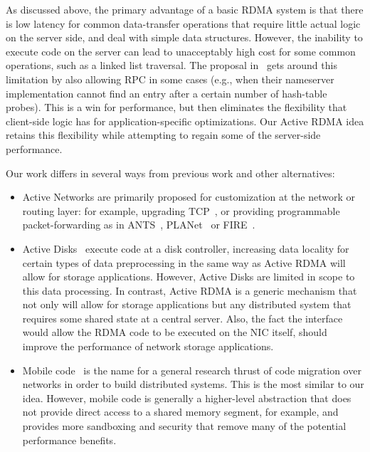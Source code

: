 \documentclass[10pt]{article}
\begin{document}
As discussed above, the primary advantage of a basic RDMA system is
that there is low latency for common data-transfer operations that
require little actual logic on the server side, and deal with simple
data structures. However, the inability to execute code on the server
can lead to unacceptably high cost for some common operations, such as
a linked list traversal. The proposal in~\cite{thekkath94} gets around
this limitation by also allowing RPC in some cases (e.g., when their
nameserver implementation cannot find an entry after a certain number
of hash-table probes). This is a win for performance, but then
eliminates the flexibility that client-side logic has for
application-specific optimizations. Our Active RDMA idea retains this
flexibility while attempting to regain some of the server-side
performance.

Our work differs in several ways from previous work and other
alternatives:

\begin{itemize} \itemsep -2pt

\item Active Networks are primarily proposed for customization at the
  network or routing layer: for example, upgrading TCP~\cite{AN-tcp},
  or providing programmable packet-forwarding as in ANTS~\cite{ANTS},
  PLANet~\cite{planet} or FIRE~\cite{FIRE}.

\item Active Disks~\cite{AD2,AD} execute code at a disk controller,
  increasing data locality for certain types of data preprocessing in
  the same way as Active RDMA will allow for storage applications.
  However, Active Disks are limited in scope to this data processing.
  In contrast, Active RDMA is a generic mechanism that not only will
  allow for storage applications but any distributed system that
  requires some shared state at a central server. Also, the fact the
  interface would allow the RDMA code to be executed on the NIC itself, 
  should improve the performance of network storage applications.

\item Mobile code~\cite{mobile} is the name for a general research
  thrust of code migration over networks in order to build distributed
  systems. This is the most similar to our idea. However, mobile
  code is generally a higher-level abstraction that does not provide
  direct access to a shared memory segment, for example, and provides
  more sandboxing and security that remove many of the potential
  performance benefits.

\end{itemize}
\end{document}

